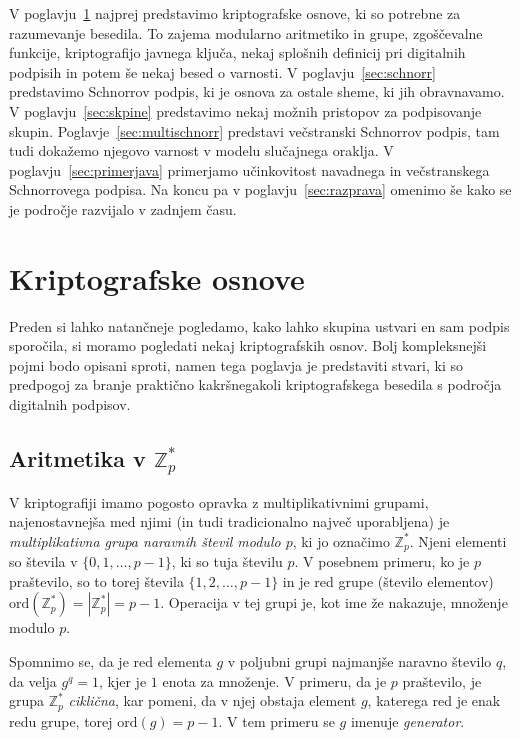 \documentclass[isrm2, tisk]{fmfdelo}
\newcommand{\Z}{\mathbb Z}
\begin{document}
V poglavju~\ref{sec:osnove} najprej predstavimo kriptografske osnove, ki so potrebne za razumevanje besedila.
To zajema modularno aritmetiko in grupe, zgoščevalne funkcije, kriptografijo javnega ključa, nekaj
splošnih definicij pri digitalnih podpisih in potem še nekaj besed o varnosti. V poglavju~\ref{sec:schnorr}
predstavimo Schnorrov podpis, ki je osnova za ostale sheme, ki jih obravnavamo. V 
poglavju~\ref{sec:skpine} predstavimo nekaj možnih pristopov za podpisovanje skupin. Poglavje~\ref{sec:multischnorr}
predstavi večstranski Schnorrov podpis, tam tudi dokažemo njegovo varnost v modelu slučajnega oraklja.
V poglavju~\ref{sec:primerjava} primerjamo učinkovitost navadnega in večstranskega Schnorrovega podpisa.
Na koncu pa v poglavju~\ref{sec:razprava} omenimo še kako se je področje razvijalo v zadnjem času.

\section{Kriptografske osnove}
\label{sec:osnove}
Preden si lahko natančneje pogledamo, kako lahko skupina ustvari en sam podpis sporočila, si moramo 
pogledati nekaj kriptografskih osnov. Bolj kompleksnejši pojmi bodo opisani sproti, namen tega 
poglavja je predstaviti stvari, ki so predpogoj za branje praktično kakršnegakoli kriptografskega 
besedila s področja digitalnih podpisov.

\subsection{Aritmetika v \texorpdfstring{$\Z_p^*$}{Zp∗}}
V kriptografiji imamo pogosto opravka z multiplikativnimi grupami, najenostavnejša med njimi (in
tudi tradicionalno največ uporabljena) je \textit{multiplikativna grupa naravnih števil modulo $p$},
ki jo označimo $\Z_p^*$. Njeni elementi so števila v $\{0, 1, \dots, p - 1\}$, ki so tuja številu $p$.
V posebnem primeru, ko je $p$ praštevilo, so to torej števila $\{1, 2, \dots, p - 1\}$ in je red grupe
(število elementov) $\text{ord}(\Z_p^*) = |\Z_p^*| = p - 1$. Operacija v tej grupi je, kot ime že
nakazuje, množenje modulo $p$.

Spomnimo se, da je red elementa $g$ v poljubni grupi najmanjše naravno število $q$, da velja $g^q = 1$,
kjer je $1$ enota za množenje. V primeru, da je $p$ praštevilo, je grupa $\Z_p^*$ \textit{ciklična},
kar pomeni, da v njej obstaja element $g$, katerega red je enak redu grupe, torej $\text{ord}(g) = p - 1$.
V tem primeru se $g$ imenuje \textit{generator}.
\end{document}
